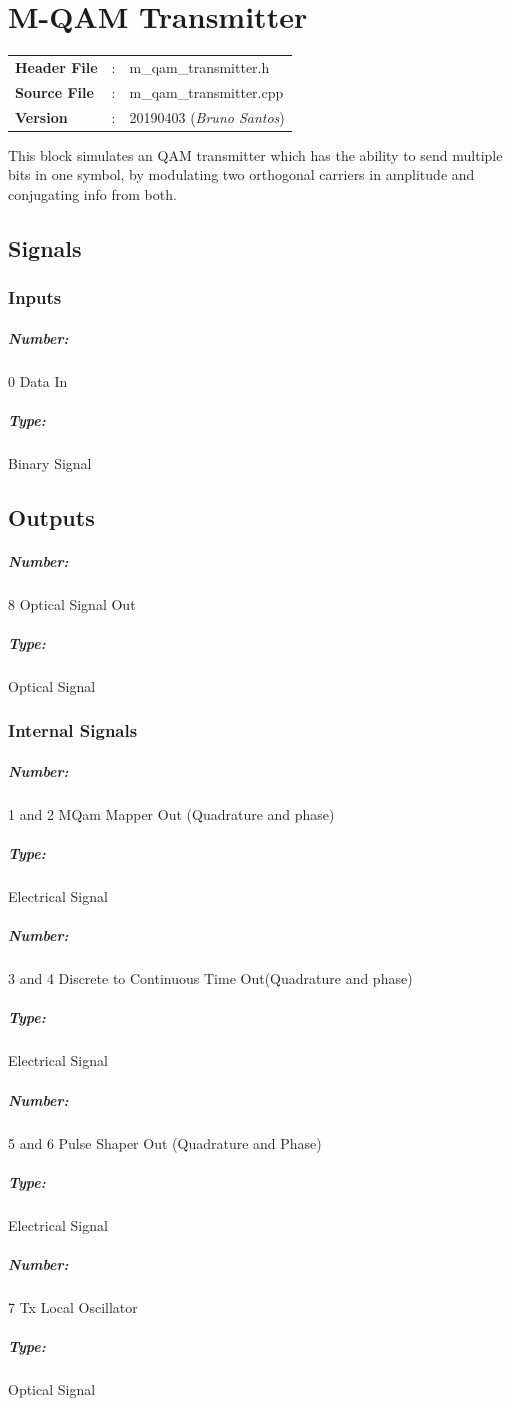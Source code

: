 

\clearpage

\section{M-QAM Transmitter}

\begin{tcolorbox}	
	\begin{tabular}{p{2.75cm} p{0.2cm} p{10.5cm}} 	
		\textbf{Header File}   &:& m\_qam\_transmitter.h \\
		\textbf{Source File}   &:& m\_qam\_transmitter.cpp \\
        \textbf{Version}       &:& 20190403 (\emph{Bruno Santos})\\
	\end{tabular}
\end{tcolorbox}
\begin{text}
This block simulates an QAM transmitter which has the ability to send multiple bits in one symbol, by modulating two orthogonal carriers in amplitude and conjugating info from both.
\end{text}

\subsection*{Signals}
\subsubsection{Inputs}
\subparagraph*{Number:} 0 Data In
\subparagraph*{Type:} Binary Signal
\bigbreak
\subsection{Outputs}
\subparagraph*{Number:} 8 Optical Signal Out
\subparagraph*{Type:} Optical Signal
\bigbreak
\subsubsection{Internal Signals}
\subparagraph*{Number:} 1 and 2 MQam Mapper Out (Quadrature and phase)
\subparagraph*{Type:} Electrical Signal
\bigbreak
\subparagraph*{Number:} 3 and 4 Discrete to Continuous Time Out(Quadrature and phase)
\subparagraph*{Type:} Electrical Signal
\bigbreak
\subparagraph*{Number:} 5 and 6 Pulse Shaper Out (Quadrature and Phase)
\subparagraph*{Type:} Electrical Signal
\bigbreak
\subparagraph*{Number:} 7 Tx Local Oscillator
\subparagraph*{Type:} Optical Signal
\bigbreak

